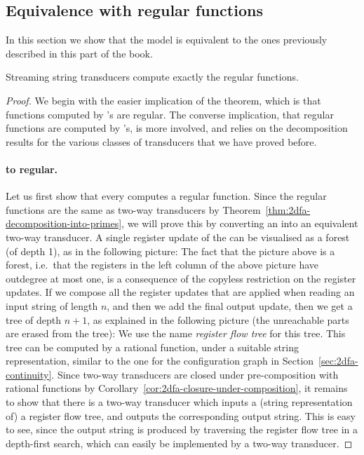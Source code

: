 \subsection{Equivalence with regular functions}
\label{sec:sst-equivalence-two-way}
In this section we show that  the \sst model is equivalent to the ones previously described in this part of the book.
\begin{theorem}
    \label{thm:sst-two-way-equivalence}
    Streaming string transducers compute exactly the regular functions.
\end{theorem}
\begin{proof} We begin with the easier implication of the theorem, which is that functions computed by \sst's are regular. The converse implication, that regular functions are computed by \sst's, is more involved, and relies on the decomposition results for the various classes of transducers that we have proved before.
\paragraph*{\sst to regular.} Let us first show that every \sst computes a regular function. Since the regular functions are the same as two-way transducers by Theorem~\ref{thm:2dfa-decomposition-into-primes}, we will prove this by converting an \sst into an equivalent two-way transducer. A single register update of the \sst can be visualised as a forest (of depth 1), as in the following picture:
The fact that the picture above is a forest, i.e.~that the registers in the left column of the above picture have outdegree at most one, is a consequence of the copyless restriction on the register updates.
If we compose all the register updates that are applied when reading an input string of length $n$, and then we add the final output update, then we get a tree of depth $n+1$, as explained in the following picture (the unreachable parts are erased from the tree):
We use the name \emph{register flow tree} for this tree. This tree can be computed by a rational function, under a suitable string representation, similar to the one for the configuration graph in Section~\ref{sec:2dfa-continuity}. Since two-way transducers are closed under pre-composition with rational functions by Corollary~\ref{cor:2dfa-closure-under-composition}, it remains to show that there is a two-way transducer which inputs a (string representation of) a  register flow tree, and outputs the corresponding output string. This is easy to see, since the output string is produced by traversing the register flow tree in a depth-first search, which can easily be implemented by a two-way transducer. 


\end{proof}

